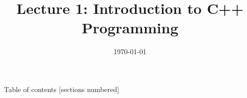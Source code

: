 \documentclass[9pt]{beamer}
\title{Lecture 1: Introduction to C++ Programming}
\subtitle{}
\date{\today}
\institute{Curtin University}
\begin{document}


\maketitle

\begin{frame}{Table of contents}
  [sections numbered]
  \tableofcontents[hideallsubsections]
\end{frame}







\end{document}
